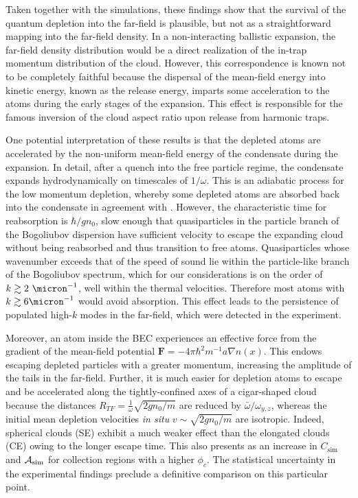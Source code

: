 {	Taken together with the simulations, these findings show that the survival of the quantum depletion into the far-field is plausible, but not as a straightforward mapping into the far-field density.
	In a non-interacting ballistic expansion, the far-field density distribution would be a direct realization of the in-trap momentum distribution of the cloud. 
	However, this correspondence is known not to be completely faithful because the dispersal of the mean-field energy into kinetic energy, known as the release energy, imparts some acceleration to the atoms during the early stages of the expansion. 
	This effect is responsible for the famous inversion of the cloud aspect ratio upon release from harmonic traps. 

	One potential interpretation of these results is that the depleted atoms are accelerated by the non-uniform mean-field energy of the condensate during the expansion.
	In detail, after a quench into the free particle regime, the condensate expands hydrodynamically on timescales of $1/\omega$. 
	This is an adiabatic process for the low momentum depletion, whereby some depleted atoms are absorbed back into the condensate in agreement with \cite{Qu16}.
	However, the characteristic time for reabsorption is $\hbar/gn_0$, slow enough that quasiparticles in the particle branch of the Bogoliubov dispersion have sufficient velocity to escape the expanding cloud without being reabsorbed and thus transition to free atoms. 
	Quasiparticles whose wavenumber exceeds that of the speed of sound lie within the particle-like branch of the Bogoliubov spectrum, which for our considerations is on the order of $k\gtrsim2~\micron^{-1}$, well within the thermal velocities. Therefore most atoms with $k\gtrsim 6 \micron^{-1}$ would avoid absorption.
	This effect leads to the persistence of populated high-$k$ modes in the far-field, which were detected in the experiment.

	Moreover, an atom inside the BEC experiences an effective force from the gradient of the mean-field potential $\textbf{F} = -4\pi\hbar^2 m^{-1}a \nabla  n(x)$. 
	This endows escaping depleted particles with a greater momentum, increasing the amplitude of the tails in the far-field. 
	Further, it is much easier for depletion atoms to escape and be accelerated along the tightly-confined axes of a cigar-shaped cloud because the distances $R_{TF}=\frac{1}{\omega}\sqrt{2gn_0/m}$ are reduced by $\bar{\omega}/\omega_{y,z}$, whereas the initial mean depletion velocities \textit{in situ} $v\sim \sqrt{2gn_0/m}$ are isotropic.
	Indeed, spherical clouds (SE) exhibit a much weaker effect than the elongated clouds (CE) owing to the longer escape time.
	This also presents as an increase in $C_\textrm{sim}$ {and $\mathcal{A}_{\rm sim}$ for} collection regions {with a higher $\phi_c$}. 
	The statistical uncertainty in the experimental findings preclude a definitive comparison on this particular point.

}

